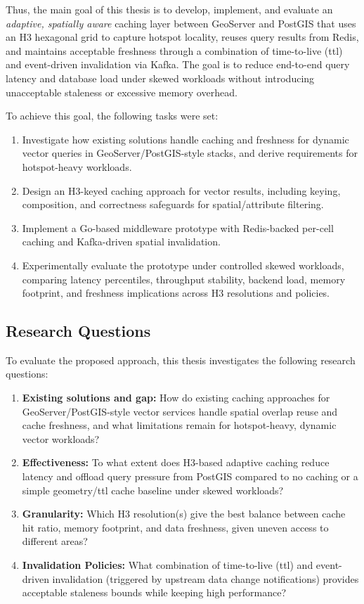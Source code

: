 Thus, the main goal of this thesis is to develop, implement, and evaluate an \emph{adaptive, spatially aware} caching layer between GeoServer and PostGIS that uses an H3 hexagonal grid to capture hotspot locality, reuses query results from Redis, and maintains acceptable freshness through a combination of time-to-live (\ac{ttl}) and event-driven invalidation via Kafka. The goal is to reduce end-to-end query latency and database load under skewed workloads without introducing unacceptable staleness or excessive memory overhead.

To achieve this goal, the following tasks were set:
\begin{enumerate}
  \item Investigate how existing solutions handle caching and freshness for dynamic vector queries in GeoServer/PostGIS-style stacks, and derive requirements for hotspot-heavy workloads.
  \item Design an H3-keyed caching approach for vector results, including keying, composition, and correctness safeguards for spatial/attribute filtering.
  \item Implement a Go-based middleware prototype with Redis-backed per-cell caching and Kafka-driven spatial invalidation.
  \item Experimentally evaluate the prototype under controlled skewed workloads, comparing latency percentiles, throughput stability, backend load, memory footprint, and freshness implications across H3 resolutions and policies.
\end{enumerate}

\subsection{Research Questions}
To evaluate the proposed approach, this thesis investigates the following research questions:

\begin{enumerate}
  \item \textbf{Existing solutions and gap:} How do existing caching approaches for GeoServer/PostGIS-style vector services handle spatial overlap reuse and cache freshness, and what limitations remain for hotspot-heavy, dynamic vector workloads?
  \item \textbf{Effectiveness:} To what extent does H3-based adaptive caching reduce latency and offload query pressure from PostGIS compared to no caching or a simple geometry/\ac{ttl} cache baseline under skewed workloads?
  \item \textbf{Granularity:} Which H3 resolution(s) give the best balance between cache hit ratio, memory footprint, and data freshness, given uneven access to different areas?
  \item \textbf{Invalidation Policies:} What combination of time-to-live (\ac{ttl}) and event-driven invalidation (triggered by upstream data change notifications) provides acceptable staleness bounds while keeping high performance?
\end{enumerate}


